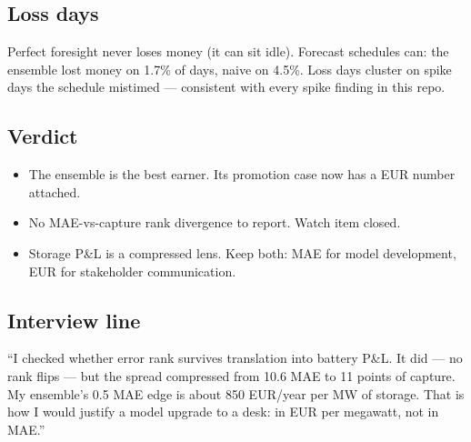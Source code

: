 \subsection{Loss days}

Perfect foresight never loses money (it can sit idle).
Forecast schedules can: the ensemble lost money on 1.7\% of days,
naive on 4.5\%. Loss days cluster on spike days the schedule
mistimed --- consistent with every spike finding in this repo.

\subsection{Verdict}

\begin{itemize}
\item The ensemble is the best earner. Its promotion case now has
      a EUR number attached.
\item No MAE-vs-capture rank divergence to report. Watch item
      closed.
\item Storage P\&L is a compressed lens. Keep both: MAE for model
      development, EUR for stakeholder communication.
\end{itemize}

\subsection{Interview line}

``I checked whether error rank survives translation into battery
P\&L. It did --- no rank flips --- but the spread compressed from
10.6 MAE to 11 points of capture. My ensemble's 0.5 MAE edge is
about 850 EUR/year per MW of storage. That is how I would justify
a model upgrade to a desk: in EUR per megawatt, not in MAE.''
